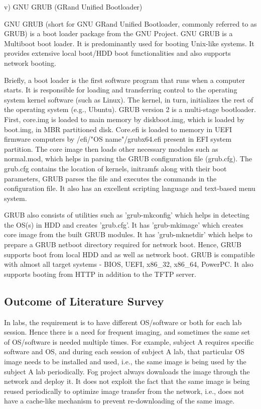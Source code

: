 \documentclass[a4paper,12pt]{article}
\begin{document}
v) GNU GRUB (GRand Unified Bootloader)

GNU GRUB (short for GNU GRand Unified Bootloader, commonly referred to as GRUB) is a boot loader package from the GNU Project. GNU GRUB is a Multiboot boot loader. It is predominantly used for booting Unix-like systems. It provides extensive local boot/HDD boot functionalities and also supports network booting. 

Briefly, a boot loader is the first software program that runs when a computer starts. It is responsible for loading and transferring control to the operating system kernel software (such as Linux). The kernel, in turn, initializes the rest of the operating system (e.g., Ubuntu). GRUB version 2 is a multi-stage bootloader. First, core.img is loaded to main memory by diskboot.img, which is loaded by boot.img,  in MBR partitioned disk. Core.efi is loaded to memory in UEFI firmware computers by /efi/"OS name"/grubx64.efi present in EFI system partition. The core image then loads other necessary modules such as normal.mod, which helps in parsing the GRUB configuration file (grub.cfg). The grub.cfg contains the location of kernels, initramfs along with their boot parameters, GRUB parses the file and executes the commands in the configuration file. It also has an excellent scripting language and text-based menu system.

GRUB also consists of utilities such as 'grub-mkconfig' which helps in detecting the OS(s) in HDD and creates 'grub.cfg'. It has 'grub-mkimage' which creates core image from the built GRUB modules. It has 'grub-mknetdir' which helps to prepare a GRUB netboot directory required for network boot. Hence, GRUB supports boot from local HDD and as well as network boot. GRUB is compatible with almost all target systems - BIOS, UEFI, x86\_32, x86\_64, PowerPC. It also supports booting from HTTP in addition to the TFTP server.

\subsection{ Outcome of Literature Survey}
In labs, the requirement is to have different OS/software or both for each lab session. Hence there is a need for frequent imaging, and sometimes the same set of OS/software is needed multiple times. For example, subject A requires specific software and OS, and during each session of subject A lab, that particular OS image needs to be installed and used, i.e., the same image is being used by the subject A lab periodically. Fog project always downloads the image through the network and deploy it. It does not exploit the fact that the same image is being reused periodically to optimize image transfer from the network, i.e., does not have a cache-like mechanism to prevent re-downloading of the same image.
\end{document}
